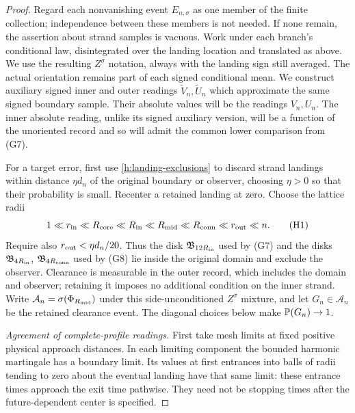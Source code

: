 \begin{proof}
Regard each nonvanishing event $E_{n,\sigma}$ as one member of the
finite collection; independence between these members is not needed.
If none remain, the assertion about strand samples is vacuous.
Work under each branch's conditional law, disintegrated over the landing
location and translated as above. We use the resulting $Z^\sigma$
notation, always with the landing sign still averaged. The actual
orientation remains part of each signed conditional mean.
We construct auxiliary signed inner and outer readings
$\widetilde V_n,\widetilde U_n$ which approximate the same signed
boundary sample. Their absolute values will be the readings $V_n,U_n$.
The inner absolute reading, unlike its signed auxiliary version, will
be a function of the unoriented record and so will admit the common
lower comparison from (G7).

For a target error, first use \eqref{h:landing-exclusions} to discard
strand landings within distance $\eta d_n$ of the original boundary
or observer, choosing $\eta>0$ so that their probability is small.
Recenter a retained landing at zero. Choose the lattice radii
\[
 1\ll r_{\rm in}\ll R_{\rm core}\ll R_{\rm in}\ll R_{\rm mid}
       \ll R_{\rm conn}\ll r_{\rm out}\ll n.                 \tag{H1}
\]
Require also $r_{\rm out}<\eta d_n/20$. Thus the disk
$\mathfrak B_{12R_{\rm in}}$ used by (G7) and the disks
$\mathfrak B_{4R_{\rm in}}$, $\mathfrak B_{4R_{\rm conn}}$ used by (G8)
lie inside the original domain and exclude the observer. Clearance is measurable in the outer
record, which includes the domain and observer; retaining it imposes no
additional condition on the inner strand. Write
$\mathcal A_n=\sigma(\Phi_{R_{\rm mid}})$ under this side-unconditioned
$Z^\sigma$ mixture, and let $G_n\in\mathcal A_n$ be the retained
clearance event. The diagonal choices below make $\mathbb P(G_n)\to1$.

\emph{Agreement of complete-profile readings.}
First take mesh limits at fixed positive physical approach distances.
In each limiting component the bounded harmonic martingale has a
boundary limit. Its values at first entrances into balls of radii
tending to zero about the eventual landing have that same limit:
these entrance times approach the exit time pathwise. They need not
be stopping times after the future-dependent center is specified.


\end{proof}
